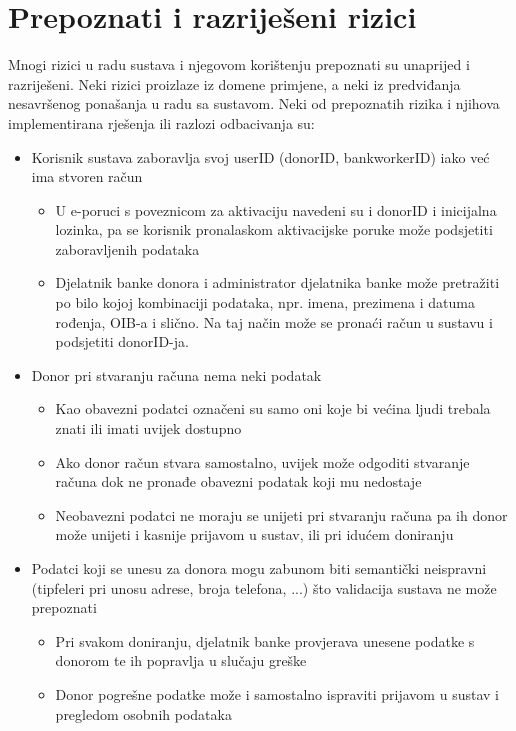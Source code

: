         \section{Prepoznati i razriješeni rizici}
            \par{
            Mnogi rizici u radu sustava i njegovom korištenju prepoznati su unaprijed i razriješeni. Neki rizici proizlaze iz domene primjene, a neki iz predviđanja nesavršenog ponašanja u radu sa sustavom. Neki od prepoznatih rizika i njihova implementirana rješenja ili razlozi odbacivanja su:
            }
            \begin{itemize}
                \item Korisnik sustava zaboravlja svoj userID (donorID, bankworkerID) iako već ima stvoren račun
                \begin{itemize}
                    \item U e-poruci s poveznicom za aktivaciju navedeni su i donorID i inicijalna lozinka, pa se korisnik pronalaskom aktivacijske poruke može podsjetiti zaboravljenih podataka
                    \item Djelatnik banke donora i administrator djelatnika banke može pretražiti po bilo kojoj kombinaciji podataka, npr. imena, prezimena i datuma rođenja, OIB-a i slično. Na taj način može se pronaći račun u sustavu i podsjetiti donorID-ja.
                \end{itemize}
                
                \item Donor pri stvaranju računa nema neki podatak
                \begin{itemize}
                    \item Kao obavezni podatci označeni su samo oni koje bi većina ljudi trebala znati ili imati uvijek dostupno
                    \item Ako donor račun stvara samostalno, uvijek može odgoditi stvaranje računa dok ne pronađe obavezni podatak koji mu nedostaje
                    \item Neobavezni podatci ne moraju se unijeti pri stvaranju računa pa ih donor može unijeti i kasnije prijavom u sustav, ili pri idućem doniranju
                \end{itemize}
                
                \item Podatci koji se unesu za donora mogu zabunom biti semantički neispravni (tipfeleri pri unosu adrese, broja telefona, ...) što validacija sustava ne može prepoznati
                \begin{itemize}
                    \item Pri svakom doniranju, djelatnik banke provjerava unesene podatke s donorom te ih popravlja u slučaju greške
                    \item Donor pogrešne podatke može i samostalno ispraviti prijavom u sustav i pregledom osobnih podataka
                \end{itemize}
                

\end{itemize}
